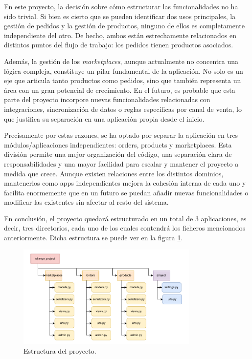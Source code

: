 En este proyecto, la decisión sobre cómo estructurar las funcionalidades no ha sido trivial. Si bien es cierto que se pueden identificar dos usos principales, la gestión de pedidos y la gestión de productos, ninguno de ellos es completamente independiente del otro. De hecho, ambos están estrechamente relacionados en distintos puntos del flujo de trabajo: los pedidos tienen productos asociados.

Además, la gestión de los \textit{marketplaces}, aunque actualmente no concentra una lógica compleja, constituye un pilar fundamental de la aplicación. No solo es un eje que articula tanto productos como pedidos, sino que también representa un área con un gran potencial de crecimiento. En el futuro, es probable que esta parte del proyecto incorpore nuevas funcionalidades relacionadas con integraciones, sincronización de datos o reglas específicas por canal de venta, lo que justifica su separación en una aplicación propia desde el inicio.

Precisamente por estas razones, se ha optado por separar la aplicación en tres módulos/aplicaciones independientes: orders, products y marketplaces. Esta división permite una mejor organización del código, una separación clara de responsabilidades y una mayor facilidad para escalar y mantener el proyecto a medida que crece. Aunque existen relaciones entre los distintos dominios, mantenerlos como apps independientes mejora la cohesión interna de cada uno y facilita enormemente que en un futuro se puedan añadir nuevas funcionalidades o modificar las existentes sin afectar al resto del sistema.

En conclusión, el proyecto quedará estructurado en un total de 3 aplicaciones, es decir, tres directorios, cada uno de los cuales contendrá los ficheros mencionados anteriormente. Dicha estructura se puede ver en la figura \ref{dev:fig:estructura_proyecto}.

\begin{figure}
    \centering
    \includegraphics[width=0.8\textwidth]{figures/design_develop/estructura_proyecto.pdf}
    \caption{Estructura del proyecto.}
    \label{dev:fig:estructura_proyecto}
\end{figure}

